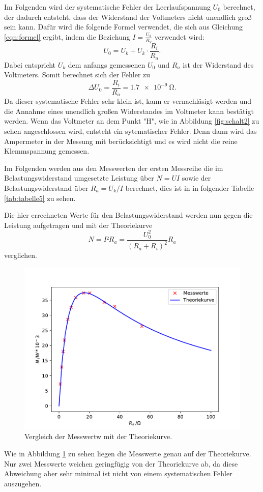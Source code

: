 \noindent Im Folgenden wird der systematische Fehler der Leerlaufspannung $U_{0}$ berechnet,
der dadurch entsteht, dass der Widerstand der Voltmeters nicht unendlich groß sein kann.
Dafür wird die folgende Formel verwendet, die sich aus Gleichung \ref{eqn:formel} ergibt, indem
die Beziehung $I=\frac{U_{k}}{R_{V}}$ verwendet wird:
\begin{equation}
  U_{0}=U_{k}+U_{k}\cdot \frac{R_{i}}{R_{a}}.
\end{equation}
Dabei entspricht $U_{k}$ dem anfangs gemessenen $U_{0}$ und $R_{a}$ ist der
Widerstand des Voltmeters. Somit berechnet sich der Fehler zu
\begin{equation}
  \Delta U_{0} = \frac{R_{i}}{R_{a}} = \SI{1.7e-9}{\ohm}.
\end{equation}
\noindent Da dieser systematische Fehler sehr klein ist, kann er vernachläsigt werden und die
Annahme eines unendlich großen Widerstandes im Voltmeter kann bestätigt werden.
Wenn das Voltmeter an dem Punkt "H", wie in Abbildung \ref{fig:schalt2}
zu sehen angeschlossen wird, entsteht ein sytematischer Fehler. Denn dann wird
das Ampermeter in der Messung mit berücksichtigt und es wird nicht die reine
Klemmspannung gemessen.

\noindent Im Folgenden werden aus den Messwerten der ersten Messreihe die
im Belastungswiderstand umgesetzte Leistung über $N=UI$ sowie der Belastungswiderstand
über $R_{a}=U_{k}/I$ berechnet, dies ist in in folgender Tabelle \ref{tab:tabelle5} zu sehen.

\noindent Die hier errechneten Werte für den Belastungswiderstand werden nun gegen
die Leistung aufgetragen und mit der Theoriekurve
\begin{equation*}
  N=I²R_{a}=\frac{U_{0}^2}{(R_{a}+R_{i})^2}R_{a}
\end{equation*}
verglichen.

\begin{figure}[H]
  \centering
  \includegraphics{plot5.pdf}
  \caption{Vergleich der Messwertw mit der Theoriekurve.}
  \label{fig:plot5}
\end{figure}
\noindent Wie in Abbildung \ref{fig:plot5} zu sehen liegen die Messwerte genau auf der
Theoriekurve. Nur zwei Messwerte weichen geringfügig von der Theoriekurve ab,
da diese Abweichung aber sehr minimal ist nicht von einem
systematischen Fehler auszugehen.

\label{sec:Auswertung}

